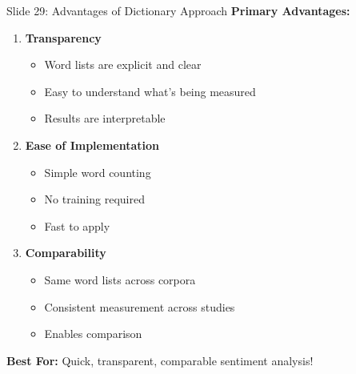 \documentclass[8pt]{beamer}
\begin{document}
	\begin{frame}{Slide 29: Advantages of Dictionary Approach}
		\fontsize{6.5}{7.5}\selectfont
		\textbf{Primary Advantages:}
		\begin{enumerate}
			\item \textbf{Transparency}
			\begin{itemize}
				\item Word lists are explicit and clear
				\item Easy to understand what's being measured
				\item Results are interpretable
			\end{itemize}
			\item \textbf{Ease of Implementation}
			\begin{itemize}
				\item Simple word counting
				\item No training required
				\item Fast to apply
			\end{itemize}
			\item \textbf{Comparability}
			\begin{itemize}
				\item Same word lists across corpora
				\item Consistent measurement across studies
				\item Enables comparison
			\end{itemize}
		\end{enumerate}
		
		\textcolor{myblue}{\textbf{Best For:}} Quick, transparent, comparable sentiment analysis!
	\end{frame}
	
\end{document}
